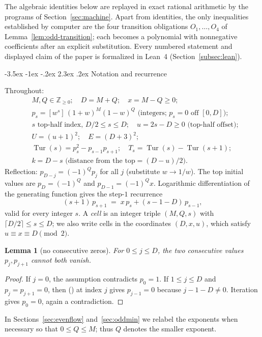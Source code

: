 \documentclass[twoside,10pt]{article}
\makeatletter
\numberwithin{equation}{section}
\theoremstyle{slbody}
\newtheorem{lemma}[theorem]{Lemma}
\theoremstyle{definition}
\theoremstyle{remark}
\numberwithin{theorem}{section}
\DeclareMathOperator{\Tur}{Tur}
\newcommand{\coeff}[1]{[#1]\,}
\renewcommand{\eqref}[1]{%
  \textup{{\normalfont(\oldstylenums{\ref{#1}}}\normalfont)}}
\renewcommand{\section}{%
  \@startsection{section}{1}{\z@}%
    {-3.5ex \@plus -1ex \@minus -.2ex}%
    {2.3ex \@plus .2ex}%
    {\normalfont\large\bfseries}}
\makeatother
\begin{document}
The algebraic identities below are replayed in exact rational arithmetic by
the programs of Section~\ref{sec:machine}.  Apart from identities, the only
inequalities established by computer are the four transition obligations
$O_1,\dots,O_4$ of Lemma~\ref{lem:odd-transition}; each becomes a polynomial
with nonnegative coefficients after an explicit substitution.  Every numbered
statement and displayed claim of the paper is formalized in Lean~4
(Section~\ref{subsec:lean}).

\section{Notation and recurrence}\label{sec:reduction}

Throughout:
\begin{align*}
  &M,Q\in\mathbb Z_{\ge0};\quad D=M+Q;\quad x=M-Q\ge 0;\\
  &p_s=\coeff{w^s}(1+w)^M(1-w)^Q \text{ (integers; } p_s=0 \text{ off } [0,D]);\\
  &s \text{ top-half index, } D/2\le s\le D;\quad u=2s-D\ge 0
    \text{ (top-half offset)};\\
  &U=(u+1)^2;\quad E=(D+3)^2;\\
  &\Tur(s)=p_s^2-p_{s-1}p_{s+1};\quad T_s=\Tur(s)-\Tur(s+1);\\
  &k=D-s \text{ (distance from the top} = (D-u)/2\text{)} .
\end{align*}
Reflection: $p_{D-j}=(-1)^Qp_j$ for all $j$ (substitute $w\to 1/w$).  The
top initial values are $p_D=(-1)^Q$ and $p_{D-1}=(-1)^Qx$.  Logarithmic
differentiation of the generating function gives the step-$1$ recurrence
\begin{equation}\label{eq:recurrence}
  (s+1)\,p_{s+1} \;=\; x\,p_s + (s-1-D)\,p_{s-1} ,
\end{equation}
valid for every integer $s$.  A \emph{cell} is an integer triple $(M,Q,s)$
with $\lceil D/2\rceil\le s\le D$; we also write cells in the coordinates
$(D,x,u)$, which satisfy $u\equiv x\equiv D\pmod2$.
\begin{lemma}[no consecutive zeros]\label{lem:no-consecutive-zeros}
For $0\le j\le D$, the two consecutive values $p_j,p_{j+1}$ cannot both
vanish.
\end{lemma}
\begin{proof}
If $j=0$, the assumption contradicts $p_0=1$.  If $1\le j\le D$ and
$p_j=p_{j+1}=0$, then \eqref{eq:recurrence} at index $j$ gives
$p_{j-1}=0$ because $j-1-D\ne0$.  Iteration gives $p_0=0$, again a
contradiction.
\end{proof}
In Sections~\ref{sec:evenflow} and~\ref{sec:oddmin} we relabel the exponents
when necessary so that $0\le Q\le M$; thus $Q$ denotes the smaller exponent.
\end{document}
